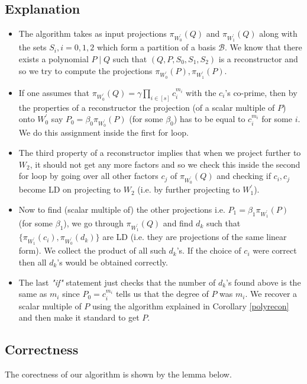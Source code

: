 \documentclass[letterpaper,USenglish,numberwithinsect]{lipics}
\newcommand{\MB}{\mathcal{B}}
\begin{document}
\subsection{Explanation}
\begin{itemize}
 \item The algorithm takes as input projections $\pi_{W_0^\prime}(Q)$ and
$\pi_{W_1^\prime}(Q)$ along with the sets $S_i,i=0,1,2$ which form a partition
of a basis $\MB$. We know that there exists a polynomial $P\mid Q$ such that
$(Q,P,S_0,S_1,S_2)$ is a reconstructor and so we try to compute the projections
$\pi_{W_0^\prime}(P),\pi_{W_1^\prime}(P)$.
\item If one assumes that $\pi_{W_0^\prime}(Q) = \gamma \prod\limits_{i\in [s]} c_i^{m_i}$ with the $c_i$'s co-prime, then
by the properties of a reconstructor the projection (of a scalar multiple of $P$) onto $W_0^\prime$  say
$P_0 = \beta_0\pi_{W_0^\prime}(P)$ (for some $\beta_0$) has to be equal to $c_i^{m_i}$ for some $i$. We do this
assignment inside the first for loop.

\item The third property of a reconstructor implies that when we project further to $W_2$, it should not get any more
factors and so we check this inside the second for loop
by going over all other factors $c_j$ of $\pi_{W_0^\prime}(Q)$ and checking if $c_i,c_j$ become LD on
projecting to $W_2$ (i.e. by further projecting to $W_1^\prime$).

\item Now to find (scalar multiple of) the other projections i.e. $P_1 = \beta_1\pi_{W_1^\prime}(P)$ (for some $\beta_1$), we go through
$\pi_{W_1^\prime}(Q)$ and find $d_k$ such that
$\{\pi_{W_1^\prime}(c_i) , \pi_{W_0^\prime}(d_k)\}$ are LD (i.e. they are projections of the same linear form). We collect the product of all such
$d_k$'s. If the choice of $c_i$ were correct then all $d_k$'s would be obtained correctly.
\item The last \emph{"if"} statement just checks that the number of $d_k$'s found above is the same as $m_i$ since $P_0=c_i^{m_i}$ tells us that
the degree of $P$ was $m_i$. We recover a scalar multiple of $P$ using the algorithm explained in Corollary \ref{polyrecon}
and then make it standard to get $P$.

\end{itemize}


\subsection{Correctness}
The corectness of our algorithm is shown by the lemma below.
\end{document}
